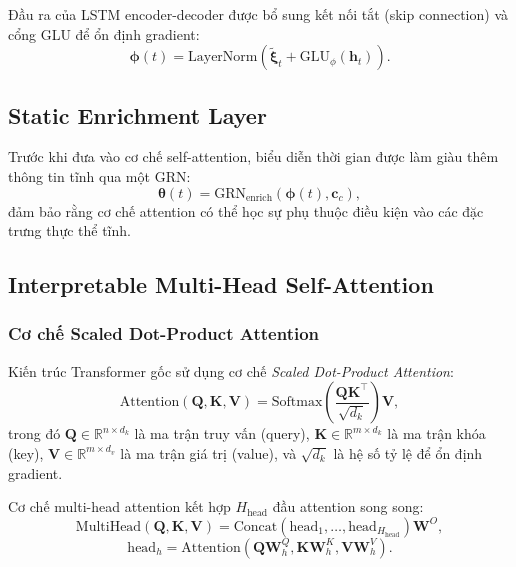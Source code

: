 Đầu ra của LSTM encoder-decoder được bổ sung kết nối tắt (skip connection) và cổng GLU để ổn định gradient:
\begin{equation}
    \boldsymbol{\phi}(t) = \text{LayerNorm}\!\left(\tilde{\boldsymbol{\xi}}_t + \text{GLU}_\phi(\mathbf{h}_t)\right).
    \label{eq:lstm_gate}
\end{equation}

\subsection{Static Enrichment Layer}
\label{subsec:static_enrich}

Trước khi đưa vào cơ chế self-attention, biểu diễn thời gian được làm giàu thêm thông tin tĩnh qua một GRN:
\begin{equation}
    \boldsymbol{\theta}(t) = \text{GRN}_{\text{enrich}}(\boldsymbol{\phi}(t), \mathbf{c}_c),
    \label{eq:static_enrich}
\end{equation}
đảm bảo rằng cơ chế attention có thể học sự phụ thuộc điều kiện vào các đặc trưng thực thể tĩnh.

\subsection{Interpretable Multi-Head Self-Attention}
\label{subsec:attention}

\subsubsection{Cơ chế Scaled Dot-Product Attention}

Kiến trúc Transformer gốc \citep{vaswani2017attention} sử dụng cơ chế \textit{Scaled Dot-Product Attention}:
\begin{equation}
    \text{Attention}(\mathbf{Q}, \mathbf{K}, \mathbf{V}) = \text{Softmax}\!\left(\frac{\mathbf{Q}\mathbf{K}^\top}{\sqrt{d_k}}\right)\mathbf{V},
    \label{eq:attention}
\end{equation}
trong đó $\mathbf{Q} \in \mathbb{R}^{n \times d_k}$ là ma trận truy vấn (query), $\mathbf{K} \in \mathbb{R}^{m \times d_k}$ là ma trận khóa (key), $\mathbf{V} \in \mathbb{R}^{m \times d_v}$ là ma trận giá trị (value), và $\sqrt{d_k}$ là hệ số tỷ lệ để ổn định gradient.

Cơ chế multi-head attention kết hợp $H_{\text{head}}$ đầu attention song song:
\begin{equation}
    \text{MultiHead}(\mathbf{Q},\mathbf{K},\mathbf{V}) = \text{Concat}(\text{head}_1, \ldots, \text{head}_{H_{\text{head}}})\mathbf{W}^O,
    \label{eq:multihead}
\end{equation}
\begin{equation}
    \text{head}_h = \text{Attention}(\mathbf{Q}\mathbf{W}^Q_h, \mathbf{K}\mathbf{W}^K_h, \mathbf{V}\mathbf{W}^V_h).
    \label{eq:head_h}
\end{equation}

